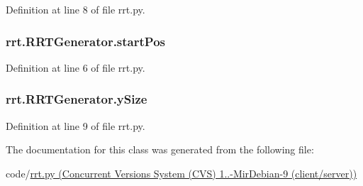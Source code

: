 Definition at line 8 of file rrt.\-py.

\hypertarget{classrrt_1_1RRTGenerator_a3a46d854a25cfb8db4235df36a09eeeb}{
\subsubsection[{start\-Pos}]{\setlength{\rightskip}{0pt plus 5cm}rrt.\-R\-R\-T\-Generator.\-start\-Pos}}\label{classrrt_1_1RRTGenerator_a3a46d854a25cfb8db4235df36a09eeeb}


Definition at line 6 of file rrt.\-py.

\hypertarget{classrrt_1_1RRTGenerator_acf8af92ceb0cae904278159b4b8c5635}{
\subsubsection[{y\-Size}]{\setlength{\rightskip}{0pt plus 5cm}rrt.\-R\-R\-T\-Generator.\-y\-Size}}\label{classrrt_1_1RRTGenerator_acf8af92ceb0cae904278159b4b8c5635}


Definition at line 9 of file rrt.\-py.



The documentation for this class was generated from the following file\-:\begin{DoxyCompactItemize}
\item 
code/\hyperlink{rrt_8py}{rrt.\-py (\-Concurrent Versions System (\-C\-V\-S) 1..-\/\-Mir\-Debian-\/9 (client/server))}\end{DoxyCompactItemize}
